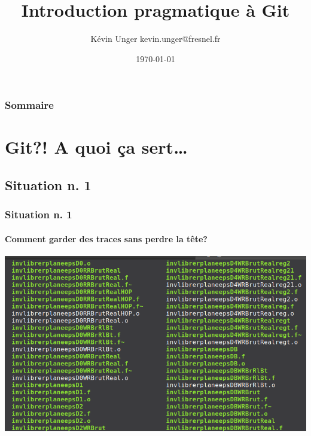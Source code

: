 \documentclass[t,11pt]{beamer}
\title{Introduction pragmatique à Git}
\author{K\'evin Unger\hspace{1mm} \newline kevin.unger@fresnel.fr}
\institute
{
        Institut Fresnel\\
        \url{https://github.com/kevung/git-presentation.git}
}
\date{\today}
\begin{document}
\begin{frame}[plain,c]
        \titlepage
\end{frame}

\begin{frame}[c]
        \frametitle{Sommaire}
        \tableofcontents[hideallsubsections]
\end{frame}


\section{Git?! A quoi ça sert\ldots}


\subsection{Situation n. 1}
\begin{frame}[label=sit1]
        \frametitle{Situation n. 1}
        \framesubtitle{Comment garder des traces sans perdre la tête?}
        \vspace{-2mm}
        \includegraphics[width=\linewidth]{./img/bazar_crop2}
\end{frame}
\end{document}

